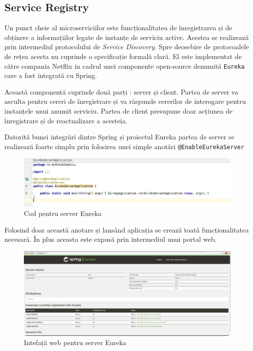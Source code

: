 \documentclass[12pt, a4paper, oneside, romanian]{teza-upb}
\begin{document}
\subsection{Service Registry}

Un punct cheie al microserviciilor este funcționalitatea de înregistrarea și de obținere a informațiilor legate de instanțe de serviciu active. Acestea se realizează prin intermediul protocolului de \textit{Service Discovery}. Spre deosebire de protocoalele de rețea acesta nu cuprinde o specificație formală clară. El este implementat de către compania Netflix in cadrul unei componente open-source denumită \texttt{Eureka} care a fost integrată cu Spring. 

Această componentă cuprinde două parți : server și client. Partea de server va asculta pentru cereri de înregistrare și va răspunde cererilor de interogare pentru instanțele unui anumit serviciu. Partea de client presupune doar acțiunea de înregistrare și de reactualizare a acesteia. 

Datorită bunei integrări dintre Spring și proiectul Eureka partea de server se realizează foarte simplu prin folosirea unei simple anotări \texttt{@EnableEurekaServer}

\begin{figure}[ht]
\centering
\includegraphics[scale=0.5]{img/spring-boot-eureka-server.png}
\caption{Cod pentru server Eureka}
\label{fig:arhi_componente}
\end{figure}

Folosind doar această anotare și lansând aplicația se crează toată funcționalitatea necesară. În plus aceasta este expusă prin intermediul unui portal web.


\begin{figure}[ht]
\centering
\includegraphics[scale=0.25]{img/spring-boot-eureka-ui.png}
\caption{Intefață web pentru server Eureka}
\label{fig:arhi_componente}
\end{figure}
\end{document}

